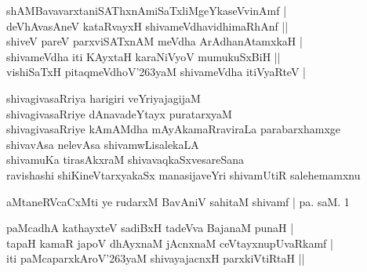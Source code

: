 \begin{entry}
\begin{shl}
shAMBavavarxtaniSAThxnAmiSaTxliMgeYkaseVvinAmf |\\
deVhAvasAneV kataRvayxH shivameVdhavidhimaRhAnf ||\\
shiveV pareV parxviSATxnAM meVdha ArAdhanAtamxkaH |\\
shivameVdha iti KAyxtaH karaNiVyoV mumukuSxBiH ||\\
vishiSaTxH pitaqmeVdhoV{\char'263}yaM shivameVdha itiVyaRteV |
\end{shl}
\end{entry}

\begin{entry}
\begin{shl}
shivagivasaRriya harigiri veYriyajagijaM\\
shivagivasaRriye dAnavadeYtayx puratarxyaM\\
shivagivasaRriye kAmAMdha mAyAkamaRraviraLa parabarxhamxge\\
shivavAsa nelevAsa shivamwLisalekaLA\\
shivamuKa tirasAkxraM shivavaqkaSxvesareSana\\
ravishashi shiKineVtarxyakaSx manasijaveYri shivamUtiR salehemamxnu
\end{shl}
\end{entry}

\begin{entry}
\gl{}
\begin{shl}
aMtaneRVcaCxMti ye rudarxM BavAniV sahitaM shivamf | pa. saM. 1
\end{shl}
\end{entry}

\begin{entry}
\begin{shl}
paMcadhA kathayxteV sadiBxH tadeVva BajanaM punaH |\\
tapaH kamaR japoV dhAyxnaM jAcnxnaM ceVtayxnupUvaRkamf |\\
iti paMcaparxkAroV{\char'263}yaM shivayajacnxH parxkiVtiRtaH ||
\end{shl}
\end{entry}

